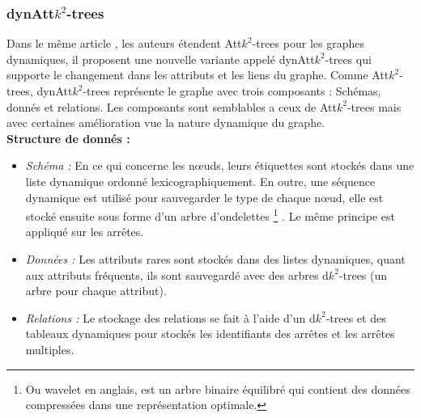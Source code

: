 \subsubsection{dynAtt$k^2$-trees }
Dans le même article \citep{alvarez2018compact}, les auteurs étendent Att$k^2$-trees pour les graphes dynamiques, il proposent une nouvelle variante appelé dynAtt$k^2$-trees qui supporte le changement dans les attributs et les liens du graphe. Comme Att$k^2$-trees, dynAtt$k^2$-trees représente le graphe avec trois composants : Schémas, donnés et relations. Les composants sont semblables a ceux de Att$k^2$-trees mais avec certaines amélioration vue la nature dynamique du graphe.\\
\textbf{Structure de donnés : } 
\begin{itemize}
\item \textit{Schéma :}  En ce qui concerne les nœuds, leurs étiquettes sont stockés dans une liste dynamique ordonné lexicographiquement. En outre, une séquence dynamique est utilisé pour sauvegarder le type de chaque nœud, elle est stocké ensuite sous forme d'un arbre d'ondelettes \footnote{Ou wavelet en anglais, est un arbre binaire équilibré qui contient des données compressées dans une représentation optimale.} \citep{grossi2003high}. Le même principe est appliqué sur les arrêtes. 
\item \textit{Données :} Les attributs rares sont stockés dans des listes dynamiques, quant aux attributs fréquents, ils sont sauvegardé avec des arbres d$k^2$-trees (un arbre pour chaque attribut).
\item \textit{Relations :} Le stockage des relations se fait à l'aide d'un d$k^2$-trees et des tableaux dynamiques pour stockés les identifiants des arrêtes et les arrêtes multiples.
\end{itemize}





























